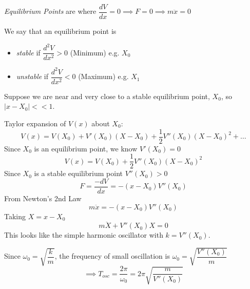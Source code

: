 \documentclass[10pt]{scrartcl}
\begin{document}
\vsp

\begin{definition}
\emph{Equilibrium Points} are where $\dfrac{dV}{dx} = 0 \implies F = 0 \implies m\ddot{x} = 0$

We say that an equilibrium point is 
\begin{itemize}
\item  \emph{stable} if $\dfrac{d^2V}{dx^2} > 0$ (Minimum) e.g. $X_0$ 
\item \emph{unstable} if $\dfrac{d^2V}{dx^2} < 0$ (Maximum) e.g. $X_1$
 \end{itemize}

\end{definition}

Suppose we are near and very close to a stable equilibrium point, $X_0$, so $|x - X_0| << 1$. 

Taylor expansion of $V(x)$ about $X_0$:
\begin{equation}V(x) = V(X_0) + V'(X_0)(X-X_0) + \frac{1}{2}V''(X_0)(X-X_0)^2 + \dots	
\end{equation}
Since $X_0$ is an equilibrium point, we know $V'(X_0) = 0$
\[V(x) = V(X_0)+ \frac{1}{2}V''(X_0)(X-X_0)^2 \]
Since $X_0$ is a stable equilibrium point $V''(X_0) >0$
\[F = \frac{-dV}{dx} = -(x-X_0)V''(X_0)\]
From Newton's 2nd Law
\[m\ddot{x} = -(x-X_0)V''(X_0)\]
Taking $X = x-X_0$
\[m\ddot{X} + V''(X_0)X = 0\]
This looks like the simple harmonic oscillator with $k = V''(X_0)$.

 Since $\omega_0 = \sqrt{\dfrac{k}{m}}$, the frequency of small oscillation is $\omega_0 = \sqrt{\dfrac{V''(X_0)}{m}}$
\[\implies T_{osc} = \frac{2\pi}{\omega_0} = 2\pi \sqrt{\dfrac{m}{V''(X_0)}}\]~
\end{document}
